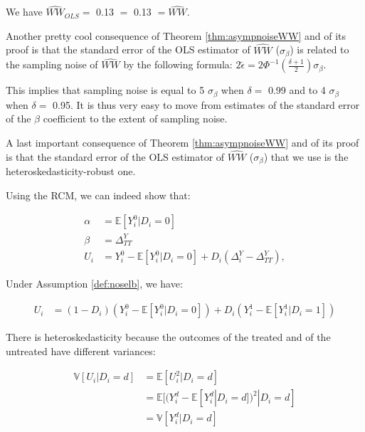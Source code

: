 \documentclass[]{book}
\newenvironment{Shaded}{\begin{snugshade}}{\end{snugshade}}
\newcommand{\KeywordTok}[1]{\textcolor[rgb]{0.13,0.29,0.53}{\textbf{#1}}}
\newcommand{\DecValTok}[1]{\textcolor[rgb]{0.00,0.00,0.81}{#1}}
\newcommand{\StringTok}[1]{\textcolor[rgb]{0.31,0.60,0.02}{#1}}
\newcommand{\OperatorTok}[1]{\textcolor[rgb]{0.81,0.36,0.00}{\textbf{#1}}}
\newcommand{\NormalTok}[1]{#1}
\newcommand{\esp}[1]{\mathbb{E}[ #1 ]}
\newcommand{\var}[1]{\mathbb{V}[ #1 ]}
\theoremstyle{definition}
\theoremstyle{definition}
\theoremstyle{definition}
\theoremstyle{remark}
\let\BeginKnitrBlock\begin \let\EndKnitrBlock\end
\begin{document}
\begin{Shaded}
\end{Shaded}

We have \(\hat{WW}_{OLS}=\) 0.13 \(=\) 0.13 \(=\hat{WW}\).

\BeginKnitrBlock{remark}
\iffalse{} {Remark. } \fi{}Another pretty cool consequence of Theorem
\ref{thm:asympnoiseWW} and of its proof is that the standard error of
the OLS estimator of \(\hat{WW}\) (\(\sigma_{\beta}\)) is related to the
sampling noise of \(\hat{WW}\) by the following formula:
\(2\tilde{\epsilon}=2\Phi^{-1}\left(\frac{\delta+1}{2}\right)\sigma_{\beta}\).
\EndKnitrBlock{remark} This implies that sampling noise is equal to 5
\(\sigma_{\beta}\) when \(\delta=\) 0.99 and to 4 \(\sigma_{\beta}\)
when \(\delta=\) 0.95. It is thus very easy to move from estimates of
the standard error of the \(\beta\) coefficient to the extent of
sampling noise.

\BeginKnitrBlock{remark}
\iffalse{} {Remark. } \fi{}A last important consequence of Theorem
\ref{thm:asympnoiseWW} and of its proof is that the standard error of
the OLS estimator of \(\hat{WW}\) (\(\sigma_{\beta}\)) that we use is
the heteroskedasticity-robust one.
\EndKnitrBlock{remark} Using the RCM, we can indeed show that:

\begin{align*}
    \alpha & = \esp{Y_i^0|D_i=0}  \\
    \beta  & =  \Delta^Y_{TT} \\
    U_i    & = Y^0_i-\esp{Y^0_i|D_i=0} + D_i(\Delta^Y_i-\Delta^Y_{TT}),
    \end{align*}

Under Assumption \ref{def:noselb}, we have:

\begin{align*}
    U_i    & = (1-D_i)(Y^0_i-\esp{Y^0_i|D_i=0}) + D_i(Y_i^1-\esp{Y^1_i|D_i=1})
  \end{align*}

There is heteroskedasticity because the outcomes of the treated and of
the untreated have different variances:

\begin{align*}
    \var{U_i|D_i=d} & = \esp{U_i^2|D_i=d}  \\
                    & = \esp{(Y^d_i-\esp{Y^d_i|D_i=d})^2|D_i=d}  \\
                    & = \var{Y_i^d|D_i=d}
  \end{align*}
\end{document}
